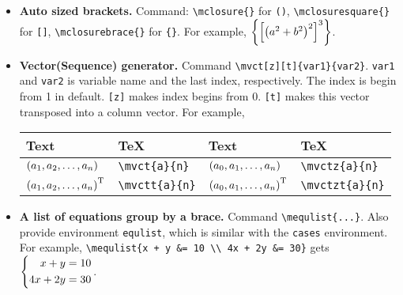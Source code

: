 \documentclass{article}
\begin{document}
\begin{itemize}
    \item \textbf{Auto sized brackets.} Command: \lstinline`\mclosure{}` for \lstinline`()`, \lstinline`\mclosuresquare{}` for \lstinline`[]`, \lstinline`\mclosurebrace{}` for \lstinline`{}`. For example, ${\left\{ { {\left[ { {\left( {a^2 + b^2} \right)}^2 } \right]}^3 } \right\}}$.

    \item \textbf{Vector(Sequence) generator.} Command \lstinline`\mvct[z][t]{var1}{var2}`. \lstinline`var1` and \lstinline`var2` is variable name and the last index, respectively. The index is begin from 1 in default. \lstinline`[z]` makes index begins from 0. \lstinline`[t]` makes this vector transposed into a column vector. For example,

          \begin{tabular}{*{4}{l}}
              \toprule
              Text           & \TeX                     & Text            & \TeX                     \\
              \midrule
              ${ ({a}_1, {a}_2, \ldots, {a}_{n}) }$  & \lstinline`\mvct{a}{n}` & ${ ({a}_0, {a}_1, \ldots, {a}_{n}) }$  & \lstinline`\mvctz{a}{n}` \\
              ${ { ({a}_1, {a}_2, \ldots, {a}_{n}) }^{\mathrm T} }$ & \lstinline`\mvctt{a}{n}` & ${ { ({a}_0, {a}_1, \ldots, {a}_{n}) }^{\mathrm T} }$ & \lstinline`\mvctzt{a}{n}` \\
              \bottomrule
          \end{tabular}

    \item \textbf{A list of equations group by a brace.} Command \lstinline`\mequlist{...}`. Also provide environment \lstinline`equlist`, which is similar with the \lstinline`cases` environment. For example, \lstinline`\mequlist{x + y &= 10 \\ 4x + 2y &= 30}` gets ${\left\{ \begin{aligned} x + y &= 10 \\ 4x + 2y &= 30 \end{aligned} \right.}$.
\end{itemize}
\end{document}
